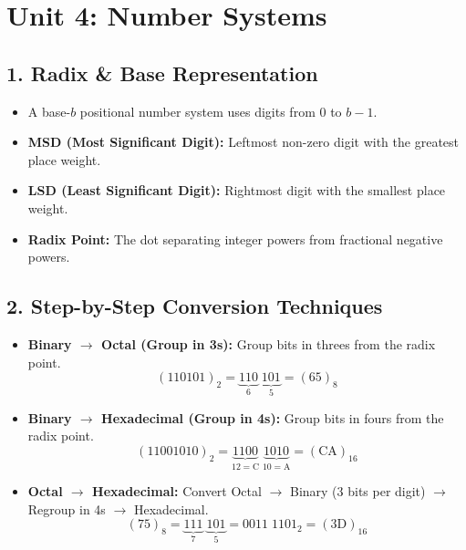 \documentclass[a4paper,11pt]{article}
\begin{document}
\newpage

\section{Unit 4: Number Systems}

\subsection{1. Radix \& Base Representation}
\begin{itemize}[leftmargin=5mm]
    \item A base-$b$ positional number system uses digits from $0$ to $b-1$.
    \item \textbf{MSD (Most Significant Digit):} Leftmost non-zero digit with the greatest place weight.
    \item \textbf{LSD (Least Significant Digit):} Rightmost digit with the smallest place weight.
    \item \textbf{Radix Point:} The dot separating integer powers from fractional negative powers.
\end{itemize}

\subsection{2. Step-by-Step Conversion Techniques}

\begin{conceptbox}
\begin{itemize}[leftmargin=5mm]
    \item \textbf{Binary $\rightarrow$ Octal (Group in 3s):} Group bits in threes from the radix point.
    \[
    (110101)_2 = \underbrace{110}_{6}\;\underbrace{101}_{5} = (65)_8
    \]
    \item \textbf{Binary $\rightarrow$ Hexadecimal (Group in 4s):} Group bits in fours from the radix point.
    \[
    (11001010)_2 = \underbrace{1100}_{12=\text{C}}\;\underbrace{1010}_{10=\text{A}} = (\text{CA})_{16}
    \]
    \item \textbf{Octal $\rightarrow$ Hexadecimal:} Convert Octal $\rightarrow$ Binary (3 bits per digit) $\rightarrow$ Regroup in 4s $\rightarrow$ Hexadecimal.
    \[
    (75)_8 = \underbrace{111}_{7}\;\underbrace{101}_{5} = 0011\;1101_2 = (3\text{D})_{16}
    \]
\end{itemize}
\end{conceptbox}
\end{document}
